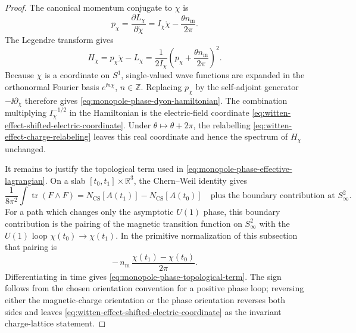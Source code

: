 \begin{proof}
The canonical momentum conjugate to \(\chi\) is
\begin{equation}
  p_\chi
  =
  \frac{\partial L_\chi}{\partial\dot\chi}
  =
  I_\chi\dot\chi-\frac{\theta n_{\mathrm m}}{2\pi}.
  \label{eq:monopole-phase-canonical-momentum}
\end{equation}
The Legendre transform gives
\begin{equation}
  H_\chi
  =
  p_\chi\dot\chi-L_\chi
  =
  \frac{1}{2I_\chi}
  \left(
    p_\chi+\frac{\theta n_{\mathrm m}}{2\pi}
  \right)^2 .
  \label{eq:monopole-phase-legendre-transform}
\end{equation}
Because \(\chi\) is a coordinate on \(S^1\), single-valued wave functions are
expanded in the orthonormal Fourier basis \(e^{\ii n\chi}\), \(n\in\mathbb Z\).
Replacing \(p_\chi\) by the self-adjoint generator
\(-\ii\partial_\chi\) therefore gives
\eqref{eq:monopole-phase-dyon-hamiltonian}.  The combination multiplying
\(I_\chi^{-1/2}\) in the Hamiltonian is the electric-field coordinate
\eqref{eq:witten-effect-shifted-electric-coordinate}.  Under
\(\theta\mapsto\theta+2\pi\), the relabelling
\eqref{eq:witten-effect-charge-relabeling} leaves this real coordinate and
hence the spectrum of \(H_\chi\) unchanged.

It remains to justify the topological term used in
\eqref{eq:monopole-phase-effective-lagrangian}.  On a slab
\([t_0,t_1]\times\mathbb R^3\), the Chern--Weil identity gives
\begin{equation}
  \frac{1}{8\pi^2}\int\operatorname{tr}(F\wedge F)
  =
  N_{\mathrm{CS}}[A(t_1)]-N_{\mathrm{CS}}[A(t_0)]
  \quad
  \text{plus the boundary contribution at }S^2_\infty .
  \label{eq:monopole-phase-cs-boundary}
\end{equation}
For a path which changes only the asymptotic \(U(1)\) phase, this boundary
contribution is the pairing of the magnetic transition function on
\(S^2_\infty\) with the \(U(1)\) loop
\(\chi(t_0)\to\chi(t_1)\).  In the primitive normalization of this subsection
that pairing is
\[
  -\,n_{\mathrm m}\,\frac{\chi(t_1)-\chi(t_0)}{2\pi}.
\]
Differentiating in time gives
\eqref{eq:monopole-phase-topological-term}.  The sign follows from the chosen
orientation convention for a positive phase loop; reversing either the
magnetic-charge orientation or the phase orientation reverses both sides and
leaves \eqref{eq:witten-effect-shifted-electric-coordinate} as the invariant
charge-lattice statement.
\end{proof}

